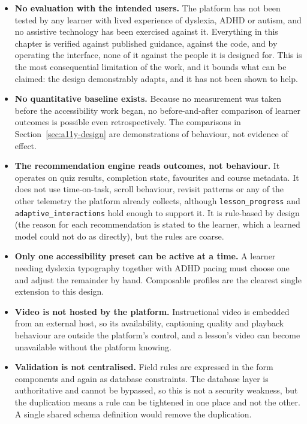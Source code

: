 \documentclass[12pt, oneside]{article} %
\begin{document}
\begin{itemize}
    \item \textbf{No evaluation with the intended users.} The platform has not been tested by any learner with lived experience of dyslexia, ADHD or autism, and no assistive technology has been exercised against it. Everything in this chapter is verified against published guidance, against the code, and by operating the interface, none of it against the people it is designed for. This is the most consequential limitation of the work, and it bounds what can be claimed: the design demonstrably adapts, and it has not been shown to help.

    \item \textbf{No quantitative baseline exists.} Because no measurement was taken before the accessibility work began, no before-and-after comparison of learner outcomes is possible even retrospectively. The comparisons in Section~\ref{sec:a11y-design} are demonstrations of behaviour, not evidence of effect.

    \item \textbf{The recommendation engine reads outcomes, not behaviour.} It operates on quiz results, completion state, favourites and course metadata. It does not use time-on-task, scroll behaviour, revisit patterns or any of the other telemetry the platform already collects, although \texttt{lesson\_progress} and \texttt{adaptive\_interactions} hold enough to support it. It is rule-based by design (the reason for each recommendation is stated to the learner, which a learned model could not do as directly), but the rules are coarse.

    \item \textbf{Only one accessibility preset can be active at a time.} A learner needing dyslexia typography together with ADHD pacing must choose one and adjust the remainder by hand. Composable profiles are the clearest single extension to this design.

    \item \textbf{Video is not hosted by the platform.} Instructional video is embedded from an external host, so its availability, captioning quality and playback behaviour are outside the platform's control, and a lesson's video can become unavailable without the platform knowing.

    \item \textbf{Validation is not centralised.} Field rules are expressed in the form components and again as database constraints. The database layer is authoritative and cannot be bypassed, so this is not a security weakness, but the duplication means a rule can be tightened in one place and not the other. A single shared schema definition would remove the duplication.


\end{itemize}
\end{document}
